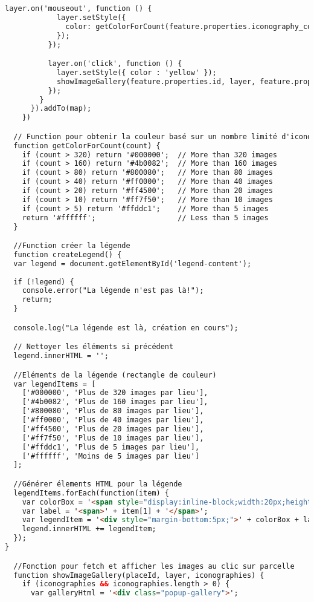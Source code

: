 \begin{lstlisting}[language=HTML, caption=Script JavaScript]
          layer.on('mouseout', function () {
            layer.setStyle({
              color: getColorForCount(feature.properties.iconography_count),
            });
          });

          layer.on('click', function () {
            layer.setStyle({ color : 'yellow' });
            showImageGallery(feature.properties.id, layer, feature.properties.iconographies);
          });
        }
      }).addTo(map);
    })

  // Function pour obtenir la couleur basé sur un nombre limité d'icono
  function getColorForCount(count) {
    if (count > 320) return '#000000';  // More than 320 images
    if (count > 160) return '#4b0082';  // More than 160 images
    if (count > 80) return '#800080';   // More than 80 images
    if (count > 40) return '#ff0000';   // More than 40 images
    if (count > 20) return '#ff4500';   // More than 20 images
    if (count > 10) return '#ff7f50';   // More than 10 images
    if (count > 5) return '#ffddc1';    // More than 5 images
    return '#ffffff';                   // Less than 5 images
  }

  //Function créer la légende
  function createLegend() {
  var legend = document.getElementById('legend-content');
  
  if (!legend) {
    console.error("La légende n'est pas là!");
    return;
  }

  console.log("La légende est là, création en cours");

  // Nettoyer les éléments si précédent
  legend.innerHTML = '';

  //Eléments de la légende (rectangle de couleur)
  var legendItems = [
    ['#000000', 'Plus de 320 images par lieu'],
    ['#4b0082', 'Plus de 160 images par lieu'],
    ['#800080', 'Plus de 80 images par lieu'],
    ['#ff0000', 'Plus de 40 images par lieu'],
    ['#ff4500', 'Plus de 20 images par lieu'],
    ['#ff7f50', 'Plus de 10 images par lieu'],
    ['#ffddc1', 'Plus de 5 images par lieu'],
    ['#ffffff', 'Moins de 5 images par lieu']
  ];

  //Générer élements HTML pour la légende
  legendItems.forEach(function(item) {
    var colorBox = '<span style="display:inline-block;width:20px;height:20px;background-color:' + item[0] + ';margin-right:10px;"></span>';
    var label = '<span>' + item[1] + '</span>';
    var legendItem = '<div style="margin-bottom:5px;">' + colorBox + label + '</div>';
    legend.innerHTML += legendItem;
  });
}

  //Fonction pour fetch et afficher les images au clic sur parcelle 
  function showImageGallery(placeId, layer, iconographies) {
    if (iconographies && iconographies.length > 0) {
      var galleryHtml = '<div class="popup-gallery">';


\end{lstlisting}
